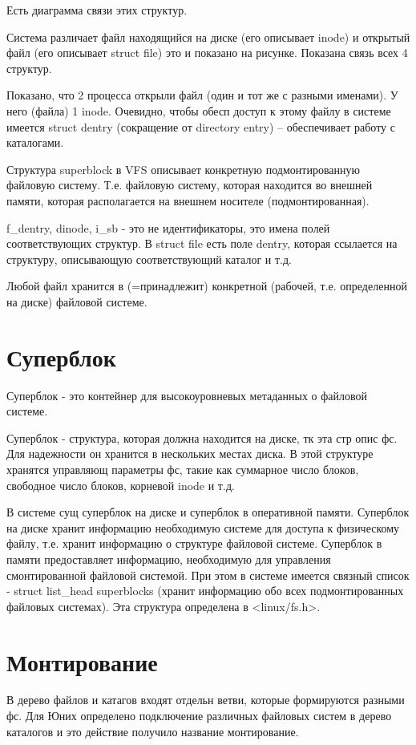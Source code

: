 Есть диаграмма связи этих структур.


\begin{figure}[H]
	\center{\texttt{[image: -7]}}
\end{figure}

Система различает файл находящийся на диске (его описывает inode) и открытый файл (его описывает struct file) это и показано на рисунке. Показана связь всех 4 структур.

Показано, что 2 процесса открыли файл (один и тот же с разными именами). У него (файла) 1 inode. Очевидно, чтобы обесп доступ к этому файлу в системе имеется struct dentry (сокращение от directory entry) -- обеспечивает работу с каталогами.

Структура superblock в VFS описывает конкретную подмонтированную файловую систему. Т.е. файловую систему, которая находится во внешней памяти, которая располагается на внешнем носителе (подмонтированная).

f\_dentry, dinode, i\_sb - это не идентификаторы, это имена полей соответствующих структур. В struct file есть поле dentry, которая ссылается на структуру, описывающую соответствующий каталог и т.д.

Любой файл хранится в (=принадлежит) конкретной (рабочей, т.е. определенной на диске) файловой системе.

\section{Суперблок}
Суперблок - это контейнер для высокоуровневых метаданных о файловой системе.

Суперблок - структура, которая должна находится на диске, тк эта стр опис фс. Для надежности он хранится в нескольких местах диска. В этой структуре хранятся управляющ параметры фс, такие как суммарное число блоков, свободное число блоков, корневой inode и т.д.

В системе сущ суперблок на диске и суперблок в оперативной памяти. Суперблок на диске хранит информацию необходимую системе для доступа к физическому файлу, т.е. хранит информацию о структуре файловой системе. Суперблок в памяти предоставляет информацию, необходимую для управления смонтированной файловой системой. При этом в системе имеется связный список - struct list\_head superblocks (хранит информацию обо всех подмонтированных файловых системах). Эта структура определена в <linux/fs.h>.

\section{Монтирование}
В дерево файлов и катагов входят отдельн ветви, которые формируются разными фс. Для Юних определено подключение различных файловых систем в дерево каталогов и это действие получило название монтирование.


